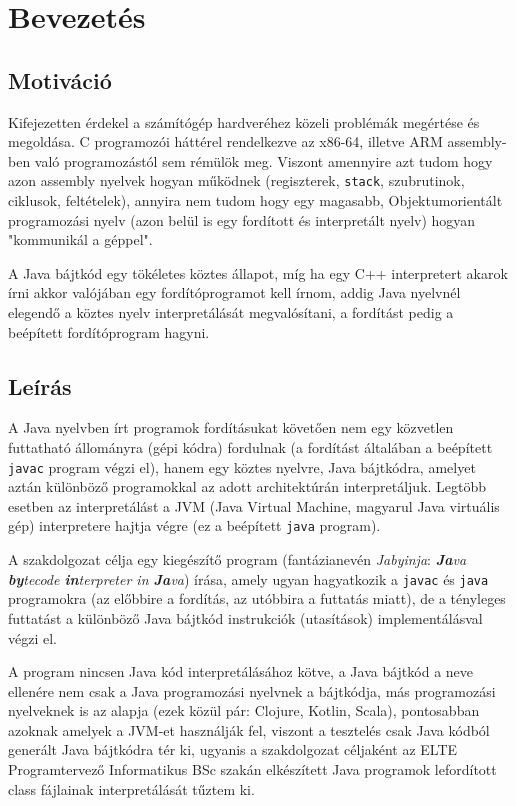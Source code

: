 \chapter{Bevezetés}
\label{ch:intro}

\section{Motiváció}

Kifejezetten érdekel a számítógép hardveréhez közeli problémák megértése és megoldása. C programozói háttérel rendelkezve az x86-64, illetve ARM assembly-ben való programozástól sem rémülök meg. Viszont amennyire azt tudom hogy azon assembly nyelvek hogyan működnek (regiszterek, \lstinline{stack}, szubrutinok, ciklusok, feltételek), annyira nem tudom hogy egy magasabb, Objektumorientált programozási nyelv (azon belül is egy fordított és interpretált nyelv) hogyan "kommunikál a géppel".

A Java bájtkód egy tökéletes köztes állapot, míg ha egy C++ interpretert akarok írni akkor valójában egy fordítóprogramot kell írnom, addig Java nyelvnél elegendő a köztes nyelv interpretálását megvalósítani, a fordítást pedig a beépített fordítóprogram hagyni.

\section{Leírás}

A Java nyelvben írt programok fordításukat követően nem egy közvetlen futtatható állományra (gépi kódra) fordulnak (a fordítást általában a beépített \lstinline{javac} program végzi el), hanem egy köztes nyelvre, Java bájtkódra, amelyet aztán különböző programokkal az adott architektúrán interpretáljuk. Legtöbb esetben az interpretálást a JVM (Java Virtual Machine, magyarul Java virtuális gép) interpretere hajtja végre (ez a beépített \lstinline{java} program).

A szakdolgozat célja egy kiegészítő program (fantázianevén \textit{Jabyinja}: \textit{\textbf{Ja}va \textbf{by}tecode \textbf{in}terpreter in \textbf{Ja}va}) írása, amely ugyan hagyatkozik a \lstinline{javac} és \lstinline{java} programokra (az előbbire a fordítás, az utóbbira a futtatás miatt), de a tényleges futtatást a különböző Java bájtkód instrukciók (utasítások) implementálásval végzi el.

A program nincsen Java kód interpretálásához kötve, a Java bájtkód a neve ellenére nem csak a Java programozási nyelvnek a bájtkódja, más programozási nyelveknek is az alapja (ezek közül pár: Clojure, Kotlin, Scala), pontosabban azoknak amelyek a JVM-et használják fel, viszont a tesztelés csak Java kódból generált Java bájtkódra tér ki, ugyanis a szakdolgozat céljaként az ELTE Programtervező Informatikus BSc szakán elkészített Java programok lefordított class fájlainak interpretálását tűztem ki.

